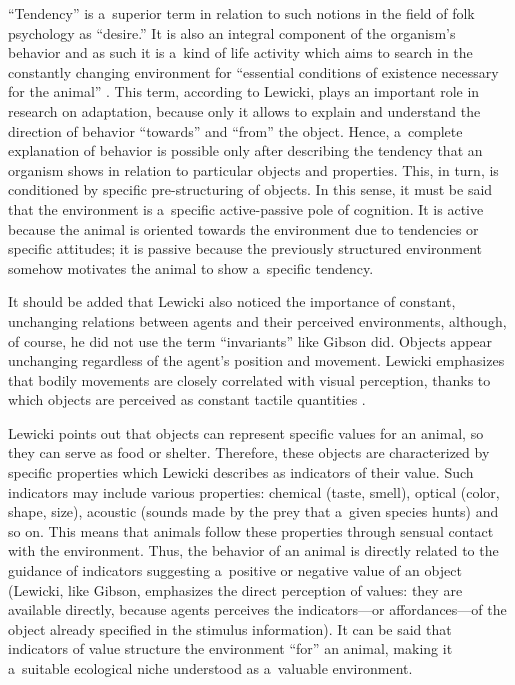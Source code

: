 \documentclass[%
manuscript=article,
year=2024,
volume=77,
doi=00000.000,
]{zfn}
\begin{document}
``Tendency'' is a~superior term in relation to such notions in the field of folk psychology as ``desire.'' It is also an integral component of the organism's behavior and as such it is a~kind of life activity which aims to search in the constantly changing environment for ``essential conditions of existence necessary for the animal'' 
\parencite[][pp.168–169]{lewicki_procesy_1960}. %
 This term, according to Lewicki, plays an important role in research on adaptation, because only it allows to explain and understand the direction of behavior ``towards'' and ``from'' the object. Hence, a~complete explanation of behavior is possible only after describing the tendency that an organism shows in relation to particular objects and properties. This, in turn, is conditioned by specific pre-structuring of objects. In this sense, it must be said that the environment is a~specific active-passive pole of cognition. It is active because the animal is oriented towards the environment due to tendencies or specific attitudes; it is passive because the previously structured environment somehow motivates the animal to show a~specific tendency.



It should be added that Lewicki also noticed the importance of constant, unchanging relations between agents and their perceived environments, although, of course, he did not use the term ``invariants'' like Gibson did. Objects appear unchanging regardless of the agent's position and movement. Lewicki emphasizes that bodily movements are closely correlated with visual perception, thanks to which objects are perceived as constant tactile quantities 
\parencite[][p.139]{lewicki_procesy_1960}.%




Lewicki points out that objects can represent specific values for an animal, so they can serve as food or shelter. Therefore, these objects are characterized by specific properties which Lewicki describes as indicators of their value. Such indicators may include various properties: chemical (taste, smell), optical (color, shape, size), acoustic (sounds made by the prey that a~given species hunts) and so on. This means that animals follow these properties through sensual contact with the environment. Thus, the behavior of an animal is directly related to the guidance of indicators suggesting a~positive or negative value of an object (Lewicki, like Gibson, emphasizes the direct perception of values: they are available directly, because agents perceives the indicators---or affordances---of the object already specified in the stimulus information). It can be said that indicators of value structure the environment ``for'' an animal, making it a~suitable ecological niche understood as a~valuable environment.
\end{document}
